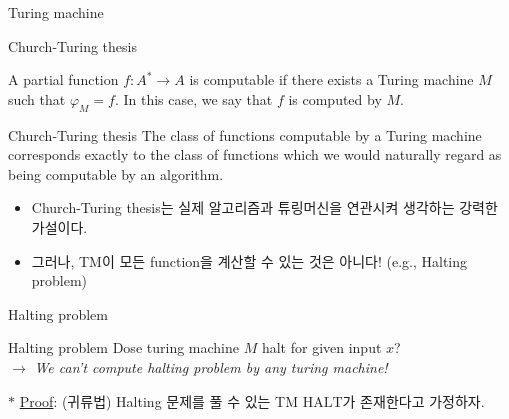 \documentclass[9pt]{beamer}
\begin{document}
\begin{section}{Turing machine}
        \begin{frame}{Church-Turing thesis}
            \begin{definition}
                A partial function $f: A^* \rightarrow A$ is computable if there exists a Turing machine $M$ such that $\varphi_M = f$. In this case, we say that $f$ is computed by $M$.
            \end{definition}
            \begin{block}{Church-Turing thesis}
                The class of functions computable by a Turing machine corresponds exactly to the class of functions which we would naturally regard as being computable by an algorithm.
            \end{block}
            \begin{itemize}
                \item Church-Turing thesis는 실제 알고리즘과 튜링머신을 연관시켜 생각하는 강력한 가설이다.
                \item 그러나, TM이 모든 function을 계산할 수 있는 것은 아니다! (e.g., Halting problem)
            \end{itemize}
        \end{frame}
        
        \begin{frame}{Halting problem}
            \begin{alertblock}{Halting problem}
                Dose turing machine $M$ halt for given input $x$?
                \\ $\rightarrow$ \textit{We can't compute halting problem by any turing machine!}
            \end{alertblock}
            \vspace{0.2cm}
            $\ast$ \underline{Proof}:
            (귀류법) Halting 문제를 풀 수 있는 TM $\text{HALT}$가 존재한다고 가정하자.
            \vspace{5cm}

        \end{frame}

    \end{section}
\end{document}
